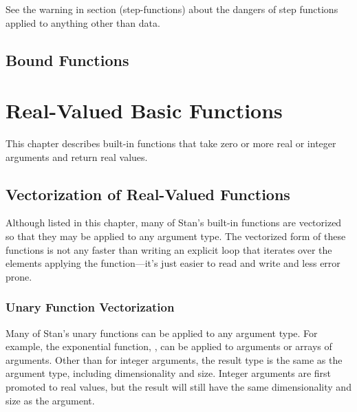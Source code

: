 \begin{description}
{See the warning in section \@ref(step-functions) about the dangers of step functions applied to anything other than data.


\section{Bound Functions}


\begin{description}       \end{description}


\chapter{Real-Valued Basic Functions}


This chapter describes built-in functions that take zero or more real or integer arguments and return real values.


\section{Vectorization of Real-Valued Functions}\label{fun-vectorization.section}


Although listed in this chapter, many of Stan's built-in functions are vectorized so that they may be applied to any argument type.  The vectorized form of these functions is not any faster than writing an explicit loop that iterates over the elements applying the function---it's just easier to read and write and less error prone.


\subsection{Unary Function Vectorization}


Many of Stan's unary functions can be applied to any argument type. For example, the exponential function, , can be applied to  arguments or arrays of  arguments.  Other than for integer arguments, the result type is the same as the argument type, including dimensionality and size.  Integer arguments are first promoted to real values, but the result will still have the same dimensionality and size as the argument.


}
\end{description}
